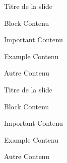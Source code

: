 \begin{frame}{Titre de la slide}
\begin{block}{Block}
Contenu
\end{block}

\begin{alertblock}{Important}
Contenu
\end{alertblock}

\begin{exampleblock}{Example}
Contenu
\end{exampleblock}

\begin{block}{Autre}
Contenu
\end{block}
\end{frame}

\begin{frame}{Titre de la slide}
\begin{block}{Block}
Contenu
\end{block}

\begin{alertblock}{Important}
Contenu
\end{alertblock}

\begin{exampleblock}{Example}
Contenu
\end{exampleblock}

\begin{block}{Autre}
Contenu
\end{block}
\end{frame}
